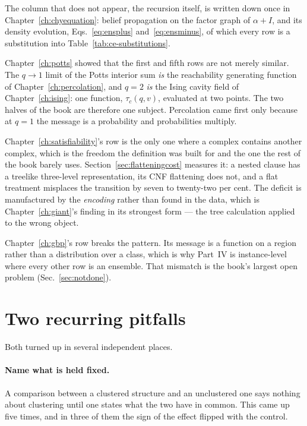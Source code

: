 The column that does not appear, the recursion itself, is written down once
in Chapter~\ref{ch:chyequation}: belief propagation on the factor graph of
$\alpha+I$, and its density evolution, Eqs.~\eqref{eq:ensplus}
and~\eqref{eq:ensminus}, of which every row is a substitution into
Table~\ref{tab:ce-substitutions}.

Chapter~\ref{ch:potts} showed that the first and fifth rows are not merely
similar. The $q\to1$ limit of the Potts interior sum \emph{is} the reachability
generating function of Chapter~\ref{ch:percolation}, and $q=2$ \emph{is} the
Ising cavity field of Chapter~\ref{ch:ising}: one function, $\tau_{c}(q,v)$,
evaluated at two points. The two halves of the book are therefore one subject.
Percolation came first only because at $q=1$ the message is a probability and
probabilities multiply.

Chapter~\ref{ch:satisfiability}'s row is the only one where a complex contains
another complex, which is the freedom the definition was built for and the one
the rest of the book barely uses. Section~\ref{sec:flatteningcost} measures it: a
nested clause has a treelike three-level representation, its CNF flattening does
not, and a flat treatment misplaces the transition by seven to twenty-two per
cent. The deficit is manufactured by the \emph{encoding} rather than found in
the data, which is Chapter~\ref{ch:giant}'s finding in its strongest form --- the
tree calculation applied to the wrong object.

Chapter~\ref{ch:gbp}'s row breaks the pattern. Its message is a function on a
region rather than a distribution over a class, which is why Part~IV is
instance-level where every other row is an ensemble. That mismatch is the
book's largest open problem (Sec.~\ref{sec:notdone}).

\section{Two recurring pitfalls}
\label{sec:threads}

Both turned up in several independent places.

\paragraph{Name what is held fixed.} A comparison between a clustered structure
and an unclustered one says nothing about clustering until one states what the
two have in common. This came up five times, and in three of them the sign of
the effect flipped with the control.

